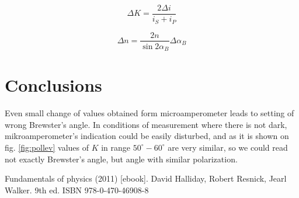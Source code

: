 \documentclass[a4paper,12pt]{article}
\begin{document}
\begin{equation}
    \Delta K = \frac{2\Delta i}{i_S+i_P} \label{eq:Ku}
\end{equation}

\begin{equation}
    \Delta n = \frac{2n}{\sin 2 \alpha_B} \Delta \alpha_B \label{eq:nu}\end{equation}

\section{Conclusions} 
Even small change of values obtained form microamperometer leads to setting of wrong Brewster's angle. In conditions of measurement where there is not dark, mikroamperometer's indication could be easily disturbed, and as it is shown on fig. \ref{fig:pollev} values of $K$ in range $50^{\circ} - 60^{\circ}$ are very similar, so we could read not exactly Brewster's angle, but angle with similar polarization.

\begin{thebibliography}{9}
    Fundamentals of physics (2011) [ebook]. David Halliday, Robert Resnick, Jearl Walker. 9th ed. ISBN 978-0-470-46908-8
\end{thebibliography}
\end{document}

